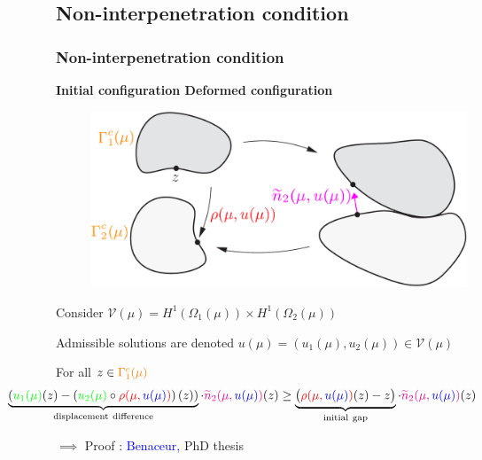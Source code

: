 \documentclass[a4paper,10pt]{beamer}
\newcommand\gr[1]{\textcolor{green} {#1} }
\newcommand\red[1]{\textcolor{red} {#1} }
\newcommand\bl[1]{\textcolor{blue} {#1} }
\newcommand\magenta[1]{\textcolor{magenta} {#1} }
\newcommand\ora[1]{\textcolor{orange}{#1}}
\begin{document}
\subsection{Non-interpenetration condition}
\begin{frame}\frametitle{Non-interpenetration condition}
\vspace{-.3cm}
\begin{center}
 {\bfseries \hspace{.7cm} Initial configuration \hspace{1.cm} Deformed configuration}
\end{center}
\vspace{-.2cm}\begin{figure}
\qquad
 \includegraphics[width=.7\textwidth]{./images/contact/scheme.png}
 \centering
\end{figure}
\vspace{0.1cm}

\pause
Consider $\mathcal V(\mu)=H^1(\Omega_1(\mu)) \times H^1(\Omega_2(\mu))$

Admissible solutions are denoted $u(\mu)=(u_1(\mu),u_2(\mu))\in\mathcal V(\mu)$

\hspace{-1.7cm}
\begin{minipage}{1.2\textwidth}
\small{
For all $z \in \ora{\Gamma^c_1(\mu)}$
\vspace{-0.3cm}
$$
\hspace{-2.1cm}\underbrace{\left(\gr{u_1(\mu)}(z)- \left(\gr{u_2(\mu)}\circ\red{\rho(\mu,\bl{u(\mu)})}\right)(z)\right)}_{\rm displacement\ difference}\cdot 
\magenta{\widetilde n_2(\mu,\bl{u(\mu)})}(z)
\geq
\underbrace{\big(\red{\rho(\mu,\bl{u(\mu)})}(z)-z\big)}_{\rm initial\ gap}\cdot \magenta{\widetilde n_2(\mu,\bl{u(\mu)})}(z)
$$
}
\vspace{-0.3cm}

{\small $\implies$ Proof : \bl{Benaceur,}PhD thesis}
\end{minipage}
\end{frame}
\end{document}
